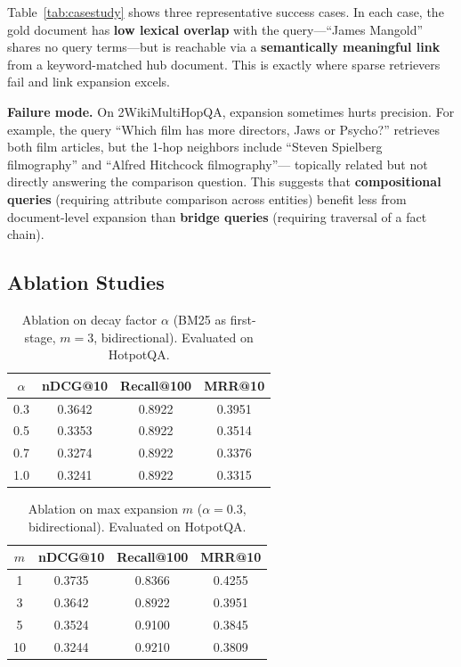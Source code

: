 \documentclass[sigconf,review]{acmart}
\begin{document}
Table~\ref{tab:casestudy} shows three representative success cases.
In each case, the gold document has \textbf{low lexical overlap} with the
query---``James Mangold'' shares no query terms---but is reachable via a
\textbf{semantically meaningful link} from a keyword-matched hub document.
This is exactly where sparse retrievers fail and link
expansion excels.

\textbf{Failure mode.}  On 2WikiMultiHopQA, expansion sometimes hurts
precision.  For example, the query ``Which film has more directors,
Jaws or Psycho?'' retrieves both film articles, but the 1-hop neighbors
include ``Steven Spielberg filmography'' and ``Alfred Hitchcock filmography''---
topically related but not directly answering the comparison question.
This suggests that \textbf{compositional queries} (requiring attribute
comparison across entities) benefit less from document-level expansion
than \textbf{bridge queries} (requiring traversal of a fact chain).

\subsection{Ablation Studies}
\label{sec:ablation}

\begin{table}[t]
\caption{Ablation on decay factor $\alpha$ (BM25 as first-stage, $m=3$, bidirectional). Evaluated on HotpotQA.}
\label{tab:abl_decay}
\centering
\begin{tabular}{@{}cccc@{}}
\toprule
$\alpha$ & \textbf{nDCG@10} & \textbf{Recall@100} & \textbf{MRR@10} \\
\midrule
0.3 & 0.3642 & 0.8922 & 0.3951 \\
0.5 & 0.3353 & 0.8922 & 0.3514 \\
0.7 & 0.3274 & 0.8922 & 0.3376 \\
1.0 & 0.3241 & 0.8922 & 0.3315 \\
\bottomrule
\end{tabular}
\end{table}

\begin{table}[t]
\caption{Ablation on max expansion $m$ ($\alpha=0.3$, bidirectional). Evaluated on HotpotQA.}
\label{tab:abl_maxexp}
\centering
\begin{tabular}{@{}cccc@{}}
\toprule
$m$ & \textbf{nDCG@10} & \textbf{Recall@100} & \textbf{MRR@10} \\
\midrule
1 & 0.3735 & 0.8366 & 0.4255 \\
3 & 0.3642 & 0.8922 & 0.3951 \\
5 & 0.3524 & 0.9100 & 0.3845 \\
10 & 0.3244 & 0.9210 & 0.3809 \\
\bottomrule
\end{tabular}
\end{table}
\end{document}
